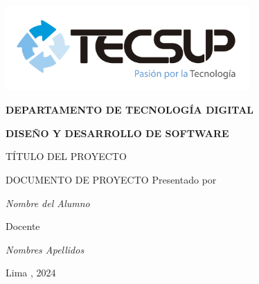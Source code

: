 \begin{titlepage}
	\centering
	\includegraphics[width=0.70\textwidth]{img/logo_tecsup_final}\par\vspace{1cm}
	\vspace{0.30cm}	
	{\scshape\large\bfseries DEPARTAMENTO DE TECNOLOG\'IA DIGITAL \par}
	\vspace{0.60cm}	
	{\scshape\large\bfseries DISEÑO Y DESARROLLO DE SOFTWARE  \par}
	\vspace{2.00cm}		
	{\large\large T\'ITULO DEL PROYECTO \par}
	\vspace{0.60cm}
	{\scshape\large DOCUMENTO DE PROYECTO }
	\vspace{0.60cm}
	\vfill
	Presentado por \par
	{\large\itshape { Nombre del Alumno }\par}
	\vspace{0.30cm}
	\vfill
	Docente \par
	{\large\itshape { Nombres Apellidos }\par}
	
  \vspace{0.30cm}
	\vfill
        {\large Lima , 2024 \par}
\end{titlepage}

